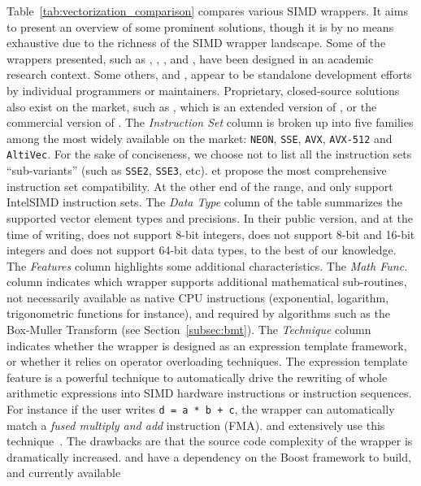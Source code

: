 Table~\ref{tab:vectorization_comparison} compares various SIMD wrappers. It aims
to present an overview of some prominent solutions, though it is by no means
exhaustive due to the richness of the SIMD wrapper landscape. Some of the
wrappers presented, such as \MIPP, \Vc, \BoostSIMD, \VCL and \TSIMD, have been
designed in an academic research context. Some others, \simdpp and \xsimd,
appear to be standalone development efforts by individual programmers or
maintainers. Proprietary, closed-source solutions also exist on the market, such
as \bSIMD, which is an extended version of \BoostSIMD, or the commercial version
of \VCL. The \textit{Instruction Set} column is broken up into five families
among the most widely available on the market: \verb|NEON|, \verb|SSE|,
\verb|AVX|, \verb|AVX-512| and \verb|AltiVec|. For the sake of conciseness, we
choose not to list all the instruction sets ``sub-variants'' (such as
\verb|SSE2|, \verb|SSE3|, etc). \simdpp et \bSIMD propose the most comprehensive
instruction set compatibility. At the other end of the range, \xsimd and
\BoostSIMD only support Intel\R SIMD instruction sets. The \textit{Data Type}
column of the table summarizes the supported vector element types and
precisions. In their public version, and at the time of writing, \Vc does not
support 8-bit integers, \xsimd does not support 8-bit and 16-bit integers and
\TSIMD does not support 64-bit data types, to the best of our knowledge. The
\textit{Features} column highlights some additional characteristics. The
\textit{Math Func.}~ column indicates which wrapper supports additional
mathematical sub-routines, not necessarily available as native CPU instructions
(exponential, logarithm, trigonometric functions for instance), and required by
algorithms such as the Box-Muller Transform (see Section~\ref{subsec:bmt}). The
\textit{\Cxx Technique} column indicates whether the wrapper is designed as an
expression template framework, or whether it relies on operator overloading
techniques. The expression template feature is a powerful technique to
automatically drive the rewriting of whole arithmetic expressions into SIMD
hardware instructions or instruction sequences. For instance if the user writes
\verb|d = a * b + c|, the wrapper can automatically match a \emph{fused multiply
and add} instruction (FMA). \BoostSIMD and \bSIMD extensively use this
technique~\cite{Esterie2012,Esterie2012a}. The drawbacks are that the source
code complexity of the wrapper is dramatically increased. \BoostSIMD and \bSIMD
have a dependency on the Boost framework to build, and currently available \Cxx
